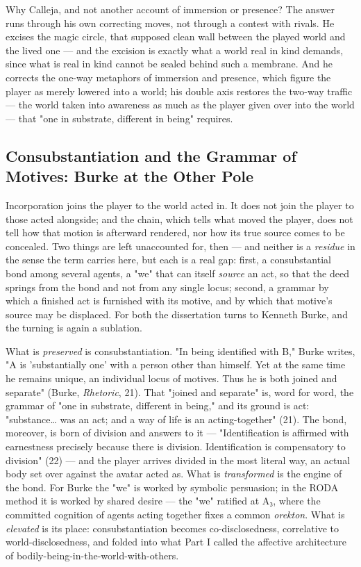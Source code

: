 \documentclass{article}
\begin{document}
Why Calleja, and not another account of immersion or presence? The answer runs through his own correcting moves, not through a contest with rivals. He excises the magic circle, that supposed clean wall between the played world and the lived one — and the excision is exactly what a world real in kind demands, since what is real in kind cannot be sealed behind such a membrane. And he corrects the one-way metaphors of immersion and presence, which figure the player as merely lowered into a world; his double axis restores the two-way traffic — the world taken into awareness as much as the player given over into the world — that "one in substrate, different in being" requires.

\subsection*{Consubstantiation and the Grammar of Motives: Burke at the Other Pole}

Incorporation joins the player to the world acted in. It does not join the player to those acted alongside; and the chain, which tells what moved the player, does not tell how that motion is afterward rendered, nor how its true source comes to be concealed. Two things are left unaccounted for, then — and neither is a \textit{residue} in the sense the term carries here, but each is a real gap: first, a consubstantial bond among several agents, a "we" that can itself \textit{source} an act, so that the deed springs from the bond and not from any single locus; second, a grammar by which a finished act is furnished with its motive, and by which that motive's source may be displaced. For both the dissertation turns to Kenneth Burke, and the turning is again a sublation.

What is \textit{preserved} is consubstantiation. "In being identified with B," Burke writes, "A is 'substantially one' with a person other than himself. Yet at the same time he remains unique, an individual locus of motives. Thus he is both joined and separate" (Burke, \textit{Rhetoric}, 21). That "joined and separate" is, word for word, the grammar of "one in substrate, different in being," and its ground is act: "substance… was an act; and a way of life is an acting-together" (21). The bond, moreover, is born of division and answers to it — "Identification is affirmed with earnestness precisely because there is division. Identification is compensatory to division" (22) — and the player arrives divided in the most literal way, an actual body set over against the avatar acted as. What is \textit{transformed} is the engine of the bond. For Burke the "we" is worked by symbolic persuasion; in the RODA method it is worked by shared desire — the "we" ratified at A₃, where the committed cognition of agents acting together fixes a common \textit{orekton}. What is \textit{elevated} is its place: consubstantiation becomes co-disclosedness, correlative to world-disclosedness, and folded into what Part I called the affective architecture of bodily-being-in-the-world-with-others.
\end{document}
